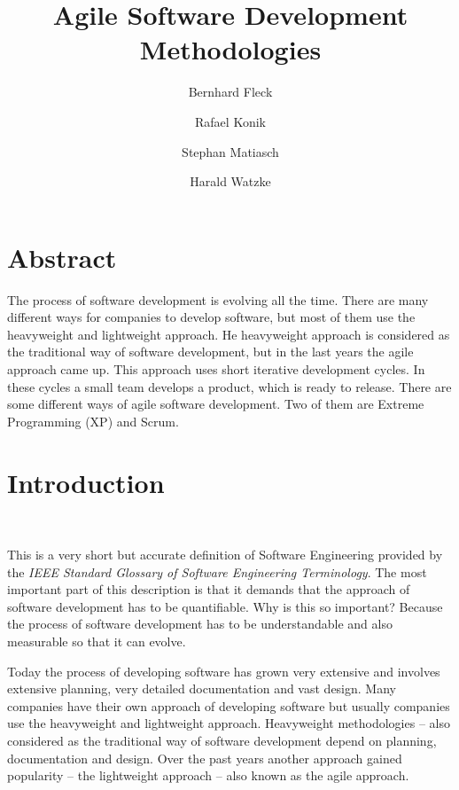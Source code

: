 



\title{Agile Software Development Methodologies}
\date{}
\author{Bernhard Fleck \and Rafael Konik \and Stephan Matiasch \and Harald Watzke}

 

\maketitle

\section*{Abstract} %
\label{abstract}

The process of software development is evolving all the time. There are many
different ways for companies to develop software, but most of them use the
heavyweight and lightweight approach. He heavyweight approach is considered as
the traditional way of software development, but in the last years the agile
approach came up. This approach uses short iterative development cycles. In
these cycles a small team develops a product, which is ready to release. There
are some different ways of agile software development. Two of them are Extreme
Programming (XP) and Scrum.



\section{Introduction} %
\label{sec:introduction}

~\cite{ieee90}

This is a very short but accurate definition of Software Engineering provided
by the \emph{IEEE Standard Glossary of Software Engineering Terminology}. The
most important part of this description is that it demands that the approach
of software development has to be quantifiable. Why is this so important?
Because the process of software development has to be understandable and also
measurable so that it can evolve.

Today the process of developing software has grown very extensive and involves
extensive planning, very detailed documentation and vast design. Many
companies have their own approach of developing software but usually companies
use the heavyweight and lightweight approach.  Heavyweight methodologies --
also considered as the traditional way of software development depend on
planning, documentation and design.  Over the past years another approach
gained popularity -- the lightweight approach -- also known as the agile
approach.

